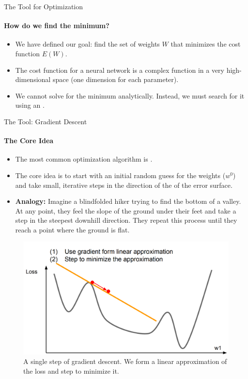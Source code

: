 \begin{frame}{The Tool for Optimization}
    \framesubtitle{How do we find the minimum?}
    \begin{itemize}
        \item We have defined our goal: find the set of weights $W$ that minimizes the cost function $E(W)$.
        \item The cost function for a neural network is a complex function in a very high-dimensional space (one dimension for each parameter).
        \item We cannot solve for the minimum analytically. Instead, we must search for it using an .
    \end{itemize}
\end{frame}

\begin{frame}{The Tool: Gradient Descent}
    \framesubtitle{The Core Idea}
    \begin{itemize}
        \item The most common optimization algorithm is .
        \item The core idea is to start with an initial random guess for the weights ($w^0$) and take small, iterative steps in the direction of the  of the error surface.
        \item \textbf{Analogy:} Imagine a blindfolded hiker trying to find the bottom of a valley. At any point, they feel the slope of the ground under their feet and take a step in the steepest downhill direction. They repeat this process until they reach a point where the ground is flat.
    \end{itemize}
    \begin{figure}
        \centering
        \includegraphics[width=0.6\linewidth]{images/gradient_descent_step.png}
        \caption{A single step of gradient descent. We form a linear approximation of the loss and step to minimize it.}
    \end{figure}
\end{frame}

